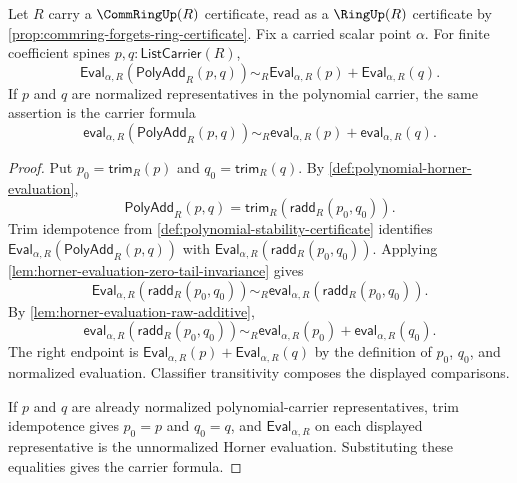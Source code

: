 \begin{theorem}
\label{thm:polynomial-evaluation-additive-homomorphism}
Let $R$ carry a $\CommRingUp(R)$ certificate, read as a $\RingUp(R)$ certificate by \autoref{prop:commring-forgets-ring-certificate}. Fix a carried scalar point $\alpha$. For finite coefficient spines $p,q:\mathsf{ListCarrier}(R)$,
$$
\mathsf{Eval}_{\alpha,R}(\mathsf{PolyAdd}_R(p,q))\sim_R
\mathsf{Eval}_{\alpha,R}(p)+\mathsf{Eval}_{\alpha,R}(q).
$$
If $p$ and $q$ are normalized representatives in the polynomial carrier, the same assertion is the carrier formula
$$
\mathsf{eval}_{\alpha,R}(\mathsf{PolyAdd}_R(p,q))\sim_R
\mathsf{eval}_{\alpha,R}(p)+\mathsf{eval}_{\alpha,R}(q).
$$
\end{theorem}
\begin{proof}
Put $p_0=\mathsf{trim}_R(p)$ and $q_0=\mathsf{trim}_R(q)$. By \autoref{def:polynomial-horner-evaluation},
$$
\mathsf{PolyAdd}_R(p,q)=\mathsf{trim}_R(\mathsf{radd}_R(p_0,q_0)).
$$
Trim idempotence from \autoref{def:polynomial-stability-certificate} identifies $\mathsf{Eval}_{\alpha,R}(\mathsf{PolyAdd}_R(p,q))$ with $\mathsf{Eval}_{\alpha,R}(\mathsf{radd}_R(p_0,q_0))$. Applying \autoref{lem:horner-evaluation-zero-tail-invariance} gives
$$
\mathsf{Eval}_{\alpha,R}(\mathsf{radd}_R(p_0,q_0))\sim_R
\mathsf{eval}_{\alpha,R}(\mathsf{radd}_R(p_0,q_0)).
$$
By \autoref{lem:horner-evaluation-raw-additive},
$$
\mathsf{eval}_{\alpha,R}(\mathsf{radd}_R(p_0,q_0))\sim_R
\mathsf{eval}_{\alpha,R}(p_0)+\mathsf{eval}_{\alpha,R}(q_0).
$$
The right endpoint is $\mathsf{Eval}_{\alpha,R}(p)+\mathsf{Eval}_{\alpha,R}(q)$ by the definition of $p_0$, $q_0$, and normalized evaluation. Classifier transitivity composes the displayed comparisons.

If $p$ and $q$ are already normalized polynomial-carrier representatives, trim idempotence gives $p_0=p$ and $q_0=q$, and $\mathsf{Eval}_{\alpha,R}$ on each displayed representative is the unnormalized Horner evaluation. Substituting these equalities gives the carrier formula.
\end{proof}

